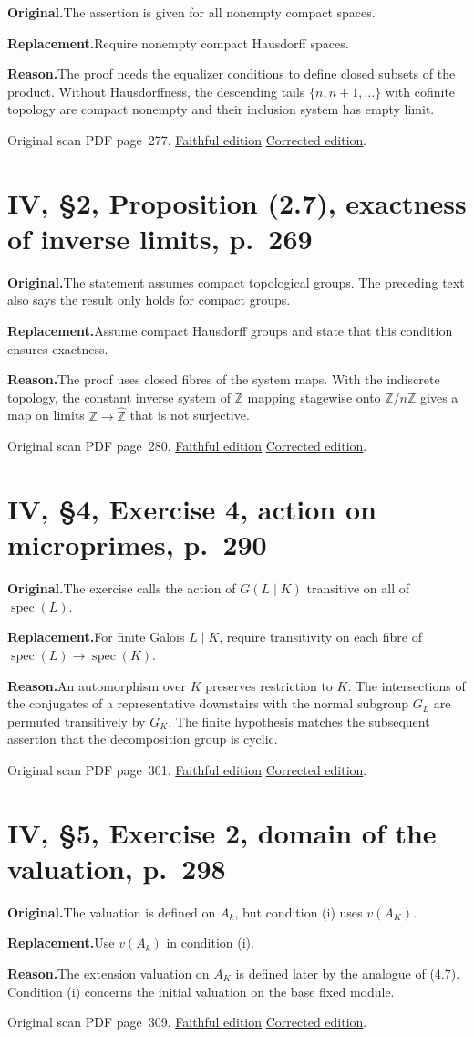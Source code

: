 \documentclass[11pt,a4paper]{article}
\newcommand{\original}{\par\smallskip\noindent\textbf{Original.}\enspace}
\newcommand{\replacement}{\par\smallskip\noindent\textbf{Replacement.}\enspace}
\newcommand{\reason}{\par\smallskip\noindent\textbf{Reason.}\enspace}
\newcommand{\editionlink}[3]{\href{#1\#errata.#2}{#3}}
\newcommand{\location}[2]{%
  \par\smallskip\noindent Original scan PDF page~#2.\enspace
  \editionlink{Neukirch_Faithful.pdf}{#1}{Faithful edition}
  \quad\editionlink{Neukirch_Corrected.pdf}{#1}{Corrected edition}.}
\begin{document}
\original The assertion is given for all nonempty compact spaces.
\replacement Require nonempty compact Hausdorff spaces.
\reason The proof needs the equalizer conditions to define closed subsets of the product. Without Hausdorffness, the descending tails $\{n,n+1,\ldots\}$ with cofinite topology are compact nonempty and their inclusion system has empty limit.
\location{102}{277}

\setcounter{section}{102}
\section{IV, \S2, Proposition (2.7), exactness of inverse limits, p.~269}\label{errata:item:103}

\original The statement assumes compact topological groups. The preceding text also says the result only holds for compact groups.
\replacement Assume compact Hausdorff groups and state that this condition ensures exactness.
\reason The proof uses closed fibres of the system maps. With the indiscrete topology, the constant inverse system of $\mathbb Z$ mapping stagewise onto $\mathbb Z/n\mathbb Z$ gives a map on limits $\mathbb Z\to\widehat{\mathbb Z}$ that is not surjective.
\location{103}{280}

\setcounter{section}{103}
\section{IV, \S4, Exercise 4, action on microprimes, p.~290}\label{errata:item:104}

\original The exercise calls the action of $G(L\mid K)$ transitive on all of $\operatorname{spec}(L)$.
\replacement For finite Galois $L\mid K$, require transitivity on each fibre of $\operatorname{spec}(L)\to\operatorname{spec}(K)$.
\reason An automorphism over $K$ preserves restriction to $K$. The intersections of the conjugates of a representative downstairs with the normal subgroup $G_L$ are permuted transitively by $G_K$. The finite hypothesis matches the subsequent assertion that the decomposition group is cyclic.
\location{104}{301}

\setcounter{section}{104}
\section{IV, \S5, Exercise 2, domain of the valuation, p.~298}\label{errata:item:105}

\original The valuation is defined on $A_k$, but condition (i) uses $v(A_K)$.
\replacement Use $v(A_k)$ in condition (i).
\reason The extension valuation on $A_K$ is defined later by the analogue of (4.7). Condition (i) concerns the initial valuation on the base fixed module.
\location{105}{309}
\end{document}
